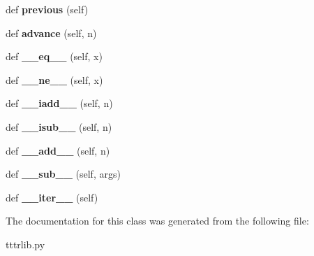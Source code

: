 \begin{DoxyCompactItemize}
def {\bfseries previous} (self)
\item 
\mbox{\label{classtttrlib_1_1_swig_py_iterator_ad6cd030e0c2355de65740338335f2afe}} 
def {\bfseries advance} (self, n)
\item 
\mbox{\label{classtttrlib_1_1_swig_py_iterator_ada2cb65e8c8325348bba7a88d6396c00}} 
def {\bfseries \+\_\+\+\_\+eq\+\_\+\+\_\+} (self, x)
\item 
\mbox{\label{classtttrlib_1_1_swig_py_iterator_a1c338d136d3eca0ee656bb05a26f5c44}} 
def {\bfseries \+\_\+\+\_\+ne\+\_\+\+\_\+} (self, x)
\item 
\mbox{\label{classtttrlib_1_1_swig_py_iterator_a5272d1913408ca2dc4a9a206443a5e1c}} 
def {\bfseries \+\_\+\+\_\+iadd\+\_\+\+\_\+} (self, n)
\item 
\mbox{\label{classtttrlib_1_1_swig_py_iterator_af7b246ea06129321394aac3439a76f5b}} 
def {\bfseries \+\_\+\+\_\+isub\+\_\+\+\_\+} (self, n)
\item 
\mbox{\label{classtttrlib_1_1_swig_py_iterator_aa216d3221fc884b3e4812fbf287781f8}} 
def {\bfseries \+\_\+\+\_\+add\+\_\+\+\_\+} (self, n)
\item 
\mbox{\label{classtttrlib_1_1_swig_py_iterator_ac6e76d6e13470cb6ae825c247dc298eb}} 
def {\bfseries \+\_\+\+\_\+sub\+\_\+\+\_\+} (self, args)
\item 
\mbox{\label{classtttrlib_1_1_swig_py_iterator_a9130c1bdb3e9c8b17dbb614ba077e45e}} 
def {\bfseries \+\_\+\+\_\+iter\+\_\+\+\_\+} (self)
\end{DoxyCompactItemize}


The documentation for this class was generated from the following file\+:\begin{DoxyCompactItemize}
\item 
tttrlib.\+py\end{DoxyCompactItemize}
